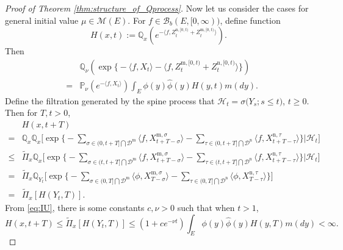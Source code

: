 \documentclass[12pt,a4paper]{amsart}
\numberwithin{equation}{section}
\theoremstyle{plain}
\theoremstyle{definition}
\begin{document}
{\begin{proof}[Proof of Theorem \ref{thm:structure_of_Qprocess}]
  Now let us consider the cases for general initial value $\mu\in\mathcal M(E)$.  For $f\in\mathcal B_b(E,[0,\infty))$, define function
  \begin{equation}\label{def:H}
    H(x,t):={\mathbb Q}_x\left(e^{-\langle f, Z^{\mathrm n, [0,t)}_{t} + Z^{\mathrm m, [0,t)}_{t}\rangle }\right).
  \end{equation}
  Then
  \begin{eqnarray*}
    &&\mathbb Q_\nu\left(\exp\Big\{-\langle f, X_t\rangle-\langle f, Z^{{\mathrm m},[0,t)}_t+Z^{{\mathrm n},[0,t)}_t\rangle \Big\}\right)\\
    &=&\mathbb P_\nu\left(e^{-\langle f, X_t\rangle}\right)\int_E\phi(y)\widehat\phi(y)H(y,t)m(dy).
  \end{eqnarray*}
  Define the filtration generated by the spine process that $\mathcal{H}_t=\sigma\big(Y_s; s\leq t\big)$, $t\geq 0$.  Then for $T,t>0$,
  \begin{equation}\label{eq:subcritical_upper_bound}
    \begin{aligned}
      &H(x,t+T)\\
      =&\mathbb Q_{x}\mathbb Q_{x}\Big[\exp\Big\{-\sum_{\sigma\in (0, t+T]\bigcap \mathcal D^{\mathrm m}}\langle f, X_{t+T-\sigma}^{{\mathrm m},\sigma}\rangle -\sum_{\tau\in (0, t+T]\bigcap \mathcal D^{\mathrm n}}\langle f, X_{t+T-\tau}^{{\mathrm n}, \tau}\rangle \Big\}\Big| \mathcal H_t\Big]\\
      \leq&\widetilde\Pi_x\mathbb Q_{x}\Big[\exp\Big\{-\sum_{\sigma\in (t, t+T]\bigcap \mathcal D^{\mathrm m}}\langle f, X_{t+T-\sigma}^{{\mathrm m},\sigma}\rangle -\sum_{\tau\in (t, t+T]\bigcap \mathcal D^{\mathrm n}}\langle f, X_{t+T-\tau}^{{\mathrm n}, \tau}\rangle \Big\}\Big| \mathcal H_t\Big]\\
      =&
      \widetilde\Pi_x\mathbb Q_{Y_t}\Big[\exp\Big\{-\sum_{\sigma\in (0, T]\bigcap \mathcal D^{\mathrm m}}\langle \phi, X_{T-\sigma}^{{\mathrm m},\sigma}\rangle -\sum_{\tau\in (0, T]\bigcap \mathcal D^{\mathrm n}}\langle \phi, X_{T-\tau}^{{\mathrm n}, \tau}\rangle \Big\}\Big]\\
      =&\widetilde\Pi_x\left[ H(Y_t, T)\right].
    \end{aligned}
  \end{equation}
  From \eqref{eq:IU}, there is some constants $c,\nu>0$ such that when $t>1$,
  \[
    H(x,t+T)\leq \widetilde\Pi_x\left[ H(Y_t, T)\right]\leq (1+ce^{-\nu t})\int_E\phi(y)\widehat\phi(y)H(y,T)m(dy)<\infty.
\]
\end{proof}}
\end{document}
